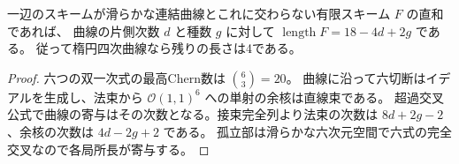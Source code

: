 \begin{corollary}\label{cor:point-graph-excess}
一辺のスキームが滑らかな連結曲線とこれに交わらない有限スキーム $F$ の直和であれば、
曲線の片側次数 $d$ と種数 $g$ に対して $\operatorname{length}F=18-4d+2g$ である。
従って楕円四次曲線なら残りの長さは4である。
\end{corollary}
\begin{proof}
六つの双一次式の最高Chern数は $\binom63=20$。
曲線に沿って六切断はイデアルを生成し、法束から $\mathcal O(1,1)^6$ への単射の余核は直線束である。
超過交叉公式で曲線の寄与はその次数となる。接束完全列より法束の次数は
$8d+2g-2$、余核の次数は $4d-2g+2$ である。
孤立部は滑らかな六次元空間で六式の完全交叉なので各局所長が寄与する。
\end{proof}
